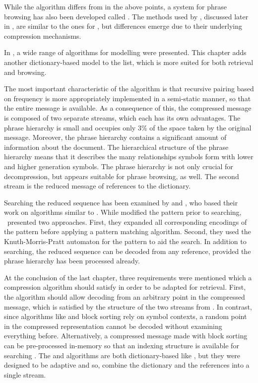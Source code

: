 While the \sequitur algorithm differs from \repair in the above
points, a system for phrase browsing has also been developed called
\phind \citep{nwp97:acmdl}.  The methods used by \phind, discussed 
later in ,
are similar to the ones for \repair, but differences emerge due
to their underlying compression mechanisms.  


In , a wide range of algorithms for modelling
were presented.  This chapter adds another dictionary-based
model to the list, which is more suited for both retrieval
and browsing.  

The most important characteristic of the \repair algorithm is that
recursive pairing based on frequency is more appropriately implemented
in a semi-static manner, so that the entire message is available.  As 
a consequence of this, the compressed message is composed of two
separate streams, which each has its own advantages.
The phrase hierarchy is small and occupies only 3\% of the space
taken by the original message.  Moreover, the phrase hierarchy
contains a significant amount of information about the document.
The hierarchical structure of the phrase hierarchy means that it
describes the many relationships symbols form with lower and 
higher generation symbols.  The phrase hierarchy is not only crucial
for decompression, but appears suitable for phrase browsing, as well.
The second stream is the reduced message of references to the
dictionary.  

Searching the reduced sequence has been examined by 
\citet{manber97:tis} and \citet{skftssa99:tech}, who based their
work on algorithms similar to \repair.  
While \citeauthor{manber97:tis} modified the pattern prior to
searching, \citeauthor{skftssa99:tech}\ presented two approaches.
First, they expanded all corresponding 
encodings of the pattern before applying a pattern matching 
algorithm.  Second, they used the Knuth-Morris-Pratt 
automaton \citep{kmp77:siam} for the pattern to aid the search.
In addition to searching, the reduced sequence can be decoded
from any reference, provided the phrase hierarchy has been processed
already.

At the conclusion of the last chapter, three requirements
were mentioned which a compression algorithm should satisfy in
order to be adapted for retrieval.  First, the algorithm should
allow decoding from an arbitrary point in the compressed message,
which is satisfied by the structure of the two streams from \repair.
In contrast, since algorithms like \ppm and block sorting rely on 
symbol contexts, a random point in the compressed representation
cannot be decoded without examining everything before.  Alternatively,
a compressed message made with block sorting can be 
pre-processed in-memory so that an indexing structure is available
for searching \citep{fm00:focs}.
The \lza and \lzb algorithms are both dictionary-based like 
\repair, but they were designed to be adaptive and so,
combine the dictionary and the references into
a single stream.


